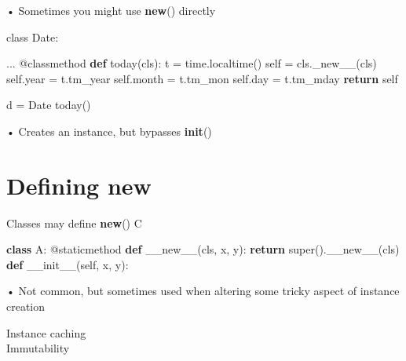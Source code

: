 \documentclass[
  letterpaper,
  DIV=11,
  numbers=noendperiod]{scrreprt}
\newenvironment{Shaded}{\begin{snugshade}}{\end{snugshade}}
\newcommand{\AttributeTok}[1]{\textcolor[rgb]{0.40,0.45,0.13}{#1}}
\newcommand{\BuiltInTok}[1]{\textcolor[rgb]{0.00,0.23,0.31}{#1}}
\newcommand{\ControlFlowTok}[1]{\textcolor[rgb]{0.00,0.23,0.31}{\textbf{#1}}}
\newcommand{\FunctionTok}[1]{\textcolor[rgb]{0.28,0.35,0.67}{#1}}
\newcommand{\KeywordTok}[1]{\textcolor[rgb]{0.00,0.23,0.31}{\textbf{#1}}}
\newcommand{\NormalTok}[1]{\textcolor[rgb]{0.00,0.23,0.31}{#1}}
\newcommand{\OperatorTok}[1]{\textcolor[rgb]{0.37,0.37,0.37}{#1}}
\newcommand{\VariableTok}[1]{\textcolor[rgb]{0.07,0.07,0.07}{#1}}
\begin{document}
• Sometimes you might use \textbf{new}() directly

class Date:

\begin{Shaded}
\begin{Highlighting}[]
\NormalTok{...}
\AttributeTok{@classmethod}
\KeywordTok{def}\NormalTok{ today(cls):}
\NormalTok{    t }\OperatorTok{=}\NormalTok{ time.localtime()}
    \VariableTok{self} \OperatorTok{=}\NormalTok{ cls.\_new\_\_(cls)}
    \VariableTok{self}\NormalTok{.year }\OperatorTok{=}\NormalTok{ t.tm\_year}
    \VariableTok{self}\NormalTok{.month }\OperatorTok{=}\NormalTok{ t.tm\_mon}
    \VariableTok{self}\NormalTok{.day }\OperatorTok{=}\NormalTok{ t.tm\_mday}
    \ControlFlowTok{return} \VariableTok{self} 
\end{Highlighting}
\end{Shaded}

\begin{Shaded}
\begin{Highlighting}[]
\NormalTok{d = Date today() }
\end{Highlighting}
\end{Shaded}

• Creates an instance, but bypasses \textbf{init}()


\chapter{Defining new}\label{defining-new}

Classes may define \textbf{new}() C

\begin{Shaded}
\begin{Highlighting}[]
\KeywordTok{class}\NormalTok{ A: }\OperatorTok{@}\NormalTok{staticmethod }\KeywordTok{def} \FunctionTok{\_\_new\_\_}\NormalTok{(cls, x, y): }\ControlFlowTok{return} \BuiltInTok{super}\NormalTok{().}\FunctionTok{\_\_new\_\_}\NormalTok{(cls) }\KeywordTok{def} \FunctionTok{\_\_init\_\_}\NormalTok{(}\VariableTok{self}\NormalTok{, x, y): }
\end{Highlighting}
\end{Shaded}

• Not common, but sometimes used when altering some tricky aspect of
instance creation

Instance caching\\
Immutability

\end{document}
